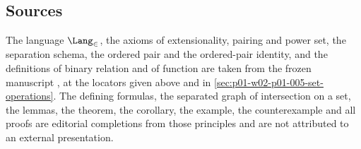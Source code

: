 \subsection{Sources}
\label{sec:p01-w02b-p01-004-sources}

The language \(\Lang_{\in}\), the axioms of extensionality, pairing and power
set, the separation schema, the ordered pair and the ordered-pair identity, and
the definitions of binary relation and of function are taken from the
frozen manuscript \cite{FrozenFormalLogicSetOperations}, at the locators given above
and in \cref{sec:p01-w02-p01-005-set-operations}. The defining formulas, the
separated graph of intersection on a set, the lemmas, the theorem, the
corollary, the example, the counterexample and all proofs are editorial
completions from those principles and are not attributed to an external
presentation.
